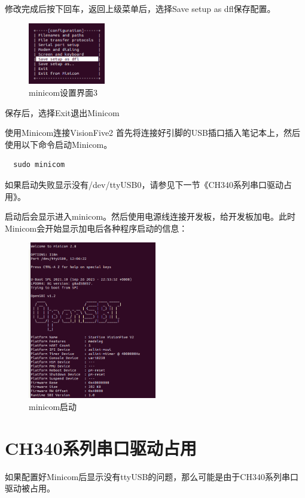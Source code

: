 \documentclass[lang=cn,10pt]{elegantbook}
\begin{document}
修改完成后按下回车，返回上级菜单后，选择Save setup as dfl保存配置。

\begin{figure}[htbp]
  \centering
  \includegraphics[width=0.3\textwidth]{image/image-20231029120447877.png}
  \caption{minicom设置界面3}
\end{figure}

保存后，选择Exit退出Minicom

使用Minicom连接VisionFive2
首先将连接好引脚的USB插口插入笔记本上，然后使用以下命令启动Minicom。

\begin{lstlisting}
  sudo minicom  
\end{lstlisting}

如果启动失败显示没有/dev/ttyUSB0，请参见下一节《CH340系列串口驱动占用》。

启动后会显示进入minicom。然后使用电源线连接开发板，给开发板加电。此时Minicom会开始显示加电后各种程序启动的信息：

\begin{figure}[htbp]
  \centering
  \includegraphics[width=0.5\textwidth]{image/image-20231029121051751.png}
  \caption{minicom启动}
\end{figure}

\section{CH340系列串口驱动占用}
如果配置好Minicom后显示没有ttyUSB的问题，那么可能是由于CH340系列串口驱动被占用。
\end{document}
